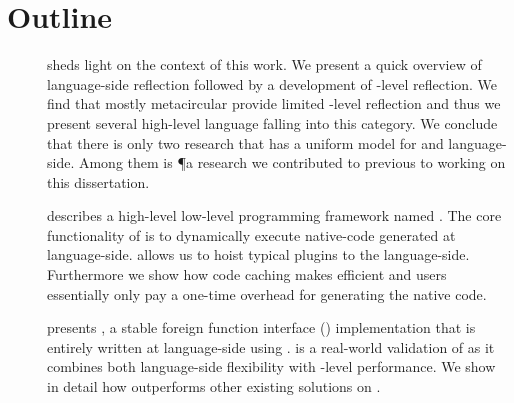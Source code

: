 \section{Outline}


\begin{description}
\item[] sheds light on the context of this work.
	We present a quick overview of language-side reflection followed by a development of \VM-level reflection.
	We find that mostly metacircular \VMs provide limited \VM-level reflection and thus we present several high-level language \VMs falling into this category.
	We conclude that there is only two research \VM that has a uniform model for \VM and language-side.
	Among them is \P a research \ST \VM we contributed to previous to working on this dissertation.


\item[] describes a high-level low-level programming framework named \B.
	The core functionality of \B is to dynamically execute native-code generated at language-side.
	\B allows us to hoist typical \VM plugins to the language-side.
	Furthermore we show how code caching makes \B efficient and users essentially only pay a one-time overhead for generating the native code.
	
\item[] presents \NB, a stable foreign function interface (\FFI) implementation that is entirely written at language-side using \B.
	\NB is a real-world validation of \B as it combines both language-side flexibility with \VM-level performance.
	We show in detail how \NB outperforms other existing \FFI solutions on \PH.


\end{description}

